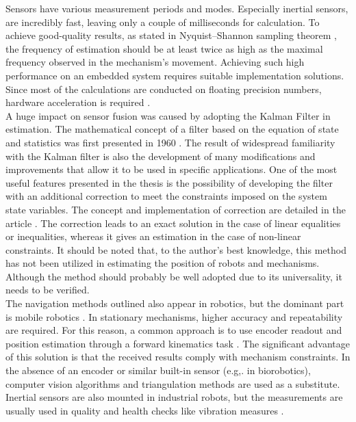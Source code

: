 Sensors have various measurement periods and modes. Especially inertial sensors, are incredibly fast, leaving only a couple of milliseconds for calculation. To achieve good-quality results, as stated in Nyquist–Shannon sampling theorem \cite{sample_theorem}, the frequency of estimation should be at least twice as high as the maximal frequency observed in the mechanism's movement. Achieving such high performance on an embedded system requires suitable implementation solutions. Since most of the calculations are conducted on floating precision numbers, hardware acceleration is required  \cite{fpu2} \cite{fpu}.\\

A huge impact on sensor fusion was caused by adopting the Kalman Filter in estimation. The mathematical concept of a filter based on the equation of state and statistics was first presented in 1960 \cite{kalman}. The result of widespread familiarity with the Kalman filter is also the development of many modifications and improvements that allow it to be used in specific applications. One of the most useful features presented in the thesis is the possibility of developing the filter with an additional correction to meet the constraints imposed on the system state variables. The concept and implementation of correction are detailed in the article \cite{simon}. The correction leads to an exact solution in the case of linear equalities or inequalities, whereas it gives an estimation in the case of non-linear constraints. It should be noted that, to the author's best knowledge, this method has not been utilized in estimating the position of robots and mechanisms. Although the method should probably be well adopted due to its universality, it needs to be verified.\\

The navigation methods outlined also appear in robotics, but the dominant part is mobile robotics \cite{accelerometer_mobile}. In stationary mechanisms, higher accuracy and repeatability are required. For this reason, a common approach is to use encoder readout and position estimation through a forward kinematics task \cite{forward_kinematics}. The significant advantage of this solution is that the received results comply with mechanism constraints. In the absence of an encoder or similar built-in sensor (e.g,. in biorobotics), computer vision algorithms \cite{cv_positioning} \cite{cv_positioning2} and triangulation methods \cite{igps} are used as a substitute. Inertial sensors are also mounted in industrial robots, but the measurements are usually used in quality and health checks like vibration measures \cite{Dogrusoz_2020}.\\

